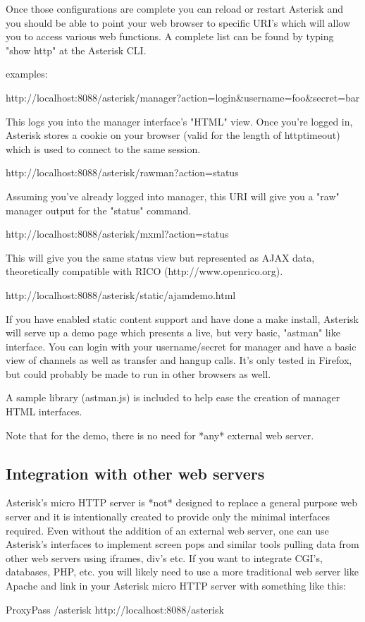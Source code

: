 Once those configurations are complete you can reload or restart 
Asterisk and you should be able to point your web browser to specific 
URI's which will allow you to access various web functions.  A complete 
list can be found by typing "show http" at the Asterisk CLI.

examples:

http://localhost:8088/asterisk/manager?action=login\&username=foo\&secret=bar

This logs you into the manager interface's "HTML" view.  Once you're 
logged in, Asterisk stores a cookie on your browser (valid for the 
length of httptimeout) which is used to connect to the same session.  

http://localhost:8088/asterisk/rawman?action=status

Assuming you've already logged into manager, this URI will give you a 
"raw" manager output for the "status" command.

http://localhost:8088/asterisk/mxml?action=status

This will give you the same status view but represented as AJAX data, 
theoretically compatible with RICO (http://www.openrico.org).

http://localhost:8088/asterisk/static/ajamdemo.html

If you have enabled static content support and have done a make install, 
Asterisk will serve up a demo page which presents a live, but very 
basic, "astman" like interface.  You can login with your username/secret 
for manager and have a basic view of channels as well as transfer and 
hangup calls.  It's only tested in Firefox, but could probably be made
to run in other browsers as well.

A sample library (astman.js) is included to help ease the creation of 
manager HTML interfaces.

Note that for the demo, there is no need for *any* external web server.

\subsection{Integration with other web servers}

Asterisk's micro HTTP server is *not* designed to replace a general 
purpose web server and it is intentionally created to provide only the 
minimal interfaces required.  Even without the addition of an external 
web server, one can use Asterisk's interfaces to implement screen pops 
and similar tools pulling data from other web servers using iframes, 
div's etc.  If you want to integrate CGI's, databases, PHP, etc.  you 
will likely need to use a more traditional web server like Apache and 
link in your Asterisk micro HTTP server with something like this:

ProxyPass /asterisk http://localhost:8088/asterisk
